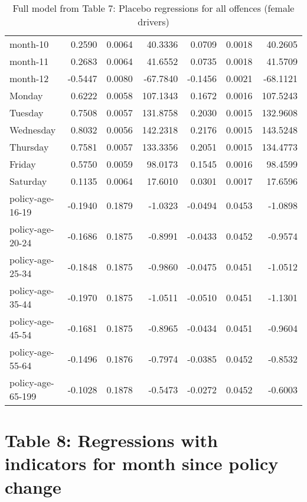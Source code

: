\documentclass[10pt]{article}
\begin{document}
\begin{table}[ht]
\begin{tabular}{lrrrrrr}
  month-10 & 0.2590 & 0.0064 & 40.3336 & 0.0709 & 0.0018 & 40.2605 \\ 
  month-11 & 0.2683 & 0.0064 & 41.6552 & 0.0735 & 0.0018 & 41.5709 \\ 
  month-12 & -0.5447 & 0.0080 & -67.7840 & -0.1456 & 0.0021 & -68.1121 \\ 
  Monday & 0.6222 & 0.0058 & 107.1343 & 0.1672 & 0.0016 & 107.5243 \\ 
  Tuesday & 0.7508 & 0.0057 & 131.8758 & 0.2030 & 0.0015 & 132.9608 \\ 
  Wednesday & 0.8032 & 0.0056 & 142.2318 & 0.2176 & 0.0015 & 143.5248 \\ 
  Thursday & 0.7581 & 0.0057 & 133.3356 & 0.2051 & 0.0015 & 134.4773 \\ 
  Friday & 0.5750 & 0.0059 & 98.0173 & 0.1545 & 0.0016 & 98.4599 \\ 
  Saturday & 0.1135 & 0.0064 & 17.6010 & 0.0301 & 0.0017 & 17.6596 \\ 
  policy-age-16-19 & -0.1940 & 0.1879 & -1.0323 & -0.0494 & 0.0453 & -1.0898 \\ 
  policy-age-20-24 & -0.1686 & 0.1875 & -0.8991 & -0.0433 & 0.0452 & -0.9574 \\ 
  policy-age-25-34 & -0.1848 & 0.1875 & -0.9860 & -0.0475 & 0.0451 & -1.0512 \\ 
  policy-age-35-44 & -0.1970 & 0.1875 & -1.0511 & -0.0510 & 0.0451 & -1.1301 \\ 
  policy-age-45-54 & -0.1681 & 0.1875 & -0.8965 & -0.0434 & 0.0451 & -0.9604 \\ 
  policy-age-55-64 & -0.1496 & 0.1876 & -0.7974 & -0.0385 & 0.0452 & -0.8532 \\ 
  policy-age-65-199 & -0.1028 & 0.1878 & -0.5473 & -0.0272 & 0.0452 & -0.6003 \\ 
   \hline
\end{tabular}
\caption{Full model from Table 7: Placebo regressions for all offences (female drivers)} 
\label{tab_7_all_pts_with_age_F}
\end{table}


\clearpage
\pagebreak




\section{Table 8: Regressions with indicators for month since policy change}
\end{document}
